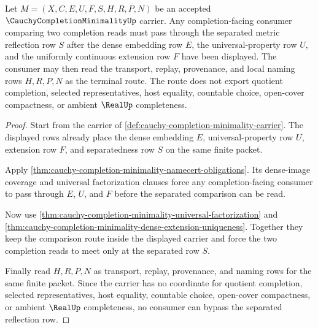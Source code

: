 \begin{theorem}
\label{thm:cauchy-completion-minimality-separated-reflection-route}
Let $M=(X,C,E,U,F,S,H,R,P,N)$ be an accepted $\CauchyCompletionMinimalityUp$ carrier. Any completion-facing consumer comparing two completion reads must pass through the separated metric reflection row $S$ after the dense embedding row $E$, the universal-property row $U$, and the uniformly continuous extension row $F$ have been displayed. The consumer may then read the transport, replay, provenance, and local naming rows $H,R,P,N$ as the terminal route. The route does not export quotient completion, selected representatives, host equality, countable choice, open-cover compactness, or ambient $\RealUp$ completeness.
\end{theorem}
\begin{proof}
Start from the carrier of \autoref{def:cauchy-completion-minimality-carrier}. The displayed rows already place the dense embedding $E$, universal-property row $U$, extension row $F$, and separatedness row $S$ on the same finite packet.

Apply \autoref{thm:cauchy-completion-minimality-namecert-obligations}. Its dense-image coverage and universal factorization clauses force any completion-facing consumer to pass through $E$, $U$, and $F$ before the separated comparison can be read.

Now use \autoref{thm:cauchy-completion-minimality-universal-factorization} and \autoref{thm:cauchy-completion-minimality-dense-extension-uniqueness}. Together they keep the comparison route inside the displayed carrier and force the two completion reads to meet only at the separated row $S$.

Finally read $H,R,P,N$ as transport, replay, provenance, and naming rows for the same finite packet. Since the carrier has no coordinate for quotient completion, selected representatives, host equality, countable choice, open-cover compactness, or ambient $\RealUp$ completeness, no consumer can bypass the separated reflection row.
\end{proof}

